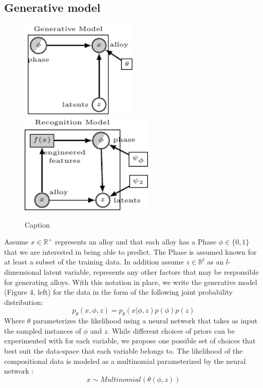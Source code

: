 \documentclass[a4paper]{article}
\begin{document}
\subsection{Generative model}
\begin{figure}[H]
    \centering
    \includegraphics[width=2.2in]{figures/HEA_Graphical_Model_Generative_Phase.pdf}
    \includegraphics[width=2.5in]{figures/HEA_Graphical_Model_Recognition_Phase.pdf}
    \caption{Caption}
    \label{fig:vae_model}
\end{figure}

Assume $x \in \mathbb{R}^+$ represents an alloy and that each alloy has a Phase $\phi \in \{0, 1\}$ that we are interested in being able to predict. The Phase is assumed known for at least a subset of the training data. In addition assume $z \in \mathbb{R}^l$ as an  $l$- dimensional latent variable, represents any other factors that may be responsible for generating alloys. With this notation in place, we write the generative model (Figure 4, left) for the data in the form of the following joint probability distribution:
\begin{equation}
    p_\theta(x, \phi, z) = p_\theta(x| \phi, z)p(\phi)p(z)
\end{equation}
Where $\theta$ parameterizes the likelihood using a neural network that takes as input the sampled instances of $\phi$ and $z$. While different choices of priors can be experimented with for each variable, we propose one possible set of choices that best suit the data-space that each variable belongs to. The likelihood of the compositional data is modeled as a multinomial parameterized by the neural network :
\begin{equation}
    x \sim Multinomial(\theta(\phi, z))
\end{equation}
\end{document}
